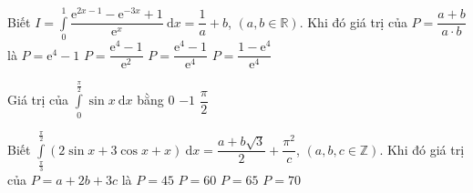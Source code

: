 \begin{ex}%
Biết $ I=\displaystyle\int\limits_0^1\dfrac{\mathrm{e}^{2x-1}-\mathrm{e}^{-3x}+1}{\mathrm{e}^x}\mathrm{~d}x=\dfrac{1}{a}+b$, $\left(a,b\in\mathbb{R}\right)$. Khi đó giá trị của $ P=\dfrac{a+b}{a\cdot b}$ là
\choice
{$ P=\mathrm{e}^4-1$}
{$ P=\dfrac{\mathrm{e}^4-1}{\mathrm{e}^2}$}
{$ P=\dfrac{\mathrm{e}^4-1}{\mathrm{e}^4}$}
{\True $ P=\dfrac{1-\mathrm{e}^4}{\mathrm{e}^4}$}
\end{ex}
%
\begin{ex}%
Giá trị của $\displaystyle\int\limits_0^{\frac{\pi}{2}}{\sin x\mathrm{~d}x}$ bằng
\choice
{0}
{}
{$-1$}
{$\dfrac{\pi}{2}$}
\end{ex}

\begin{ex}%
Biết $\displaystyle\int\limits_{\tfrac{\pi}{3}}^{\tfrac{\pi}{2}}{\left(2\sin x+3\cos x+x\right)\mathrm{~d}x}=\dfrac{a+b\sqrt{3}}{2}+\dfrac{\pi^2}{c}$, $\left(a,b,c\in\mathbb{Z}\right)$. Khi đó giá trị của $ P=a+2b+3c$ là
\choice
{$ P=45$}
{\True $ P=60$}
{$ P=65$}
{$ P=70$}
\end{ex}

